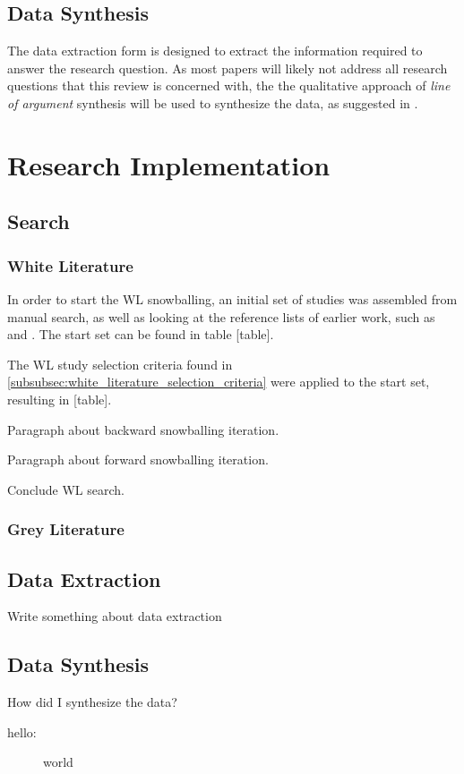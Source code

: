 \subsection{Data Synthesis}
The data extraction form is designed to extract the information required to answer the research question.
As most papers will likely not address all research questions that this review is concerned with, the the qualitative approach of \textit{line of argument} synthesis will be used to synthesize the data, as suggested in \cite{Kitchenham07guidelinesfor}.

\section{Research Implementation}
\label{sec:research_implementation}

\subsection{Search}
\subsubsection{White Literature}
In order to start the WL snowballing, an initial set of studies was assembled from manual search, as well as looking at the reference lists of earlier work, such as \cite{John2021} and \cite{MartinezFernandez2021}.
The start set can be found in table [table].

The WL study selection criteria found in \cref{subsubsec:white_literature_selection_criteria} were applied to the start set, resulting in [table].

Paragraph about backward snowballing iteration.

Paragraph about forward snowballing iteration.

Conclude WL search.

\subsubsection{Grey Literature}

\subsection{Data Extraction}
Write something about data extraction

\subsection{Data Synthesis}
How did I synthesize the data?

\begin{description}
\item[hello:] world
\end{description}
